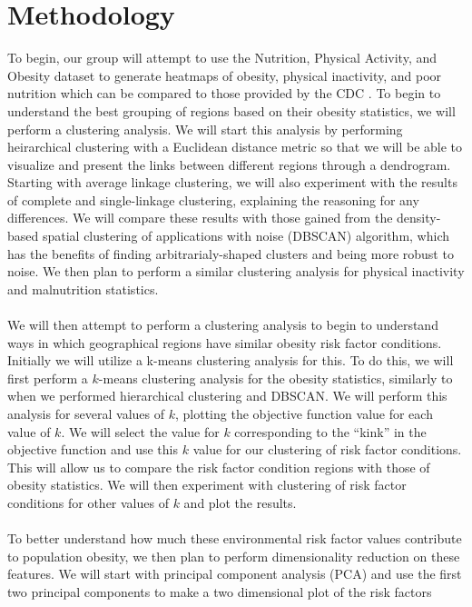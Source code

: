 \documentclass{article}
\begin{document}
\section{Methodology}
\label{methodology}
To begin, our group will attempt to use the Nutrition, Physical Activity, and Obesity dataset to generate heatmaps of obesity, physical inactivity, and poor nutrition which can be compared to those provided by the CDC \cite{adultobesitymaps}. 
To begin to understand the best grouping of regions based on their obesity statistics, we will perform a clustering analysis. 
We will start this analysis by performing heirarchical clustering with a Euclidean distance metric so that we will be able to visualize and present the links between different regions through a dendrogram. 
Starting with average linkage clustering, we will also experiment with the results of complete and single-linkage clustering, explaining the reasoning for any differences. 
We will compare these results with those gained from the density-based spatial clustering of applications with noise (DBSCAN) algorithm, which has the benefits of finding arbitrarialy-shaped clusters and being more robust to noise. 
We then plan to perform a similar clustering analysis for physical inactivity and malnutrition statistics.
\\\\
We will then attempt to perform a clustering analysis to begin to understand ways in which geographical regions have similar obesity risk factor conditions. 
Initially we will utilize a k-means clustering analysis for this. To do this, we will first perform a $k$-means clustering analysis for the obesity statistics, similarly to when we performed hierarchical clustering and DBSCAN. 
We will perform this analysis for several values of $k$, plotting the objective function value for each value of $k$. We will select the value for $k$ corresponding to the “kink” in the objective function and use this $k$ value for our clustering of risk factor conditions. 
This will allow us to compare the risk factor condition regions with those of obesity statistics. 
We will then experiment with clustering of risk factor conditions for other values of $k$ and plot the results.
\\\\
To better understand how much these environmental risk factor values contribute to population obesity, we then plan to perform dimensionality reduction on these features. 
We will start with principal component analysis (PCA) and use the first two principal components to make a two dimensional plot of the risk factors 
\end{document}
